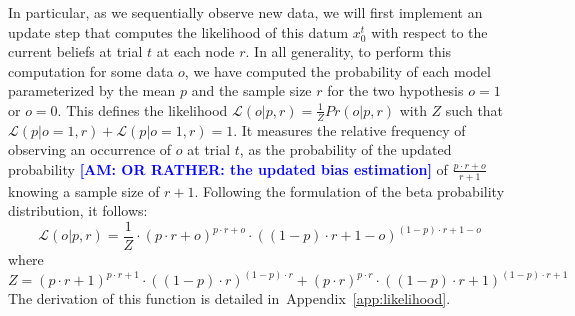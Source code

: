 \documentclass[12pt,english]{article}%
\newcommand{\eq}[1]{\begin{equation*}#1\end{equation*}}
\newcommand{\eql}[1]{\begin{equation}#1\end{equation}}
\newcommand{\Ll}{\mathcal{L}}
\newcommand{\citep}[1]{\parencite{#1}}
\newcommand{\seeApp}[1]{Appendix~\ref{app:#1}}
\newcommand{\AM}[1]{\textbf{\textcolor{blue}{[AM: #1]}}}
\begin{document}
In particular, as we sequentially observe new data,
we will first implement an update step that
computes the likelihood of this datum $x_0^t$ with respect to
the current beliefs at trial $t$ at each node $r$.
In all generality, to perform this computation for some data $o$,
we have computed the probability of each model
parameterized by the mean $p$ and the sample size $r$
for the two hypothesis $o=1$ or $o=0$.
This defines the likelihood
$\Ll(o | p, r) = \frac{1}{Z} Pr(o |p, r)$
with $Z$ such that $\Ll(p | o=1, r) + \Ll(p | o=1, r)=1$.
It measures the relative frequency of observing an occurrence of $o$ at trial $t$,
as the probability of the updated probability
\AM{OR RATHER: the updated bias estimation} of $\frac{p\cdot r + o}{r+1}$
knowing a sample size of $r+1$.
Following the formulation of the beta probability distribution, it follows:
\eql{%
\Ll(o | p, r) = \frac{1}{Z} \cdot {(p\cdot r + o)}^{p\cdot r + o} \cdot {((1- p)\cdot r + 1- o)}^{(1- p)\cdot r + 1- o}
\label{eq:likelihood}
}
where
\eq{
Z = {(p\cdot r + 1)}^{p\cdot r + 1}  \cdot {((1- p)\cdot r )}^{(1- p)\cdot r }  +
    {(p\cdot r )}^{p\cdot r }  \cdot {((1- p)\cdot r + 1)}^{(1- p)\cdot r + 1}
}
The derivation of this function is detailed in~\seeApp{likelihood}.
\end{document}
